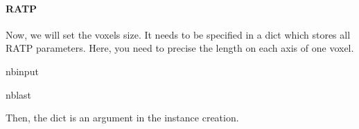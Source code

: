 \documentclass[letterpaper,10pt,english]{sphinxmanual}
\begin{document}
\paragraph{RATP}
\label{\detokenize{tool_basics:id1}}
\sphinxAtStartPar
Now, we will set the voxels size. It needs to be specified in a dict which stores all RATP parameters. Here, you need to precise the length on each axis of one voxel.

\begin{sphinxuseclass}{nbinput}
\begin{sphinxuseclass}{nblast}
{
\begin{sphinxVerbatim}[commandchars=\\\{\}]
\llap{\color{nbsphinxin}[9]:\,\hspace{\fboxrule}\hspace{\fboxsep}}    \PYG{p}{[}\PYG{p}{]}   
\end{sphinxVerbatim}
}

\end{sphinxuseclass}
\end{sphinxuseclass}
\sphinxAtStartPar
Then, the dict is an argument in the instance creation.
\end{document}

